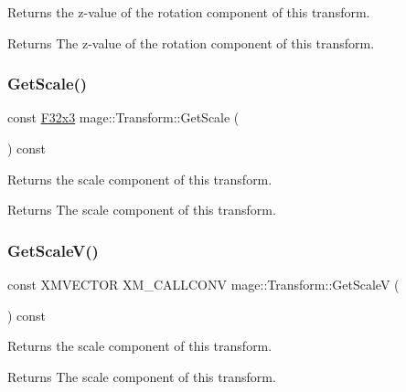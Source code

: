 Returns the z-\/value of the rotation component of this transform.

\begin{DoxyReturn}{Returns}
The z-\/value of the rotation component of this transform. 
\end{DoxyReturn}
\hypertarget{classmage_1_1_transform_a6d166fd4201a61c24b8d96cd5bba45f8}{}\label{classmage_1_1_transform_a6d166fd4201a61c24b8d96cd5bba45f8} 
\subsubsection{\texorpdfstring{Get\+Scale()}{GetScale()}}
{\footnotesize\ttfamily const \hyperlink{namespacemage_a73fbe0da4b8d5bc156bb8453e5b63a17}{F32x3} mage\+::\+Transform\+::\+Get\+Scale (\begin{DoxyParamCaption}{ }\end{DoxyParamCaption}) const\hspace{0.3cm}{\ttfamily [noexcept]}}

Returns the scale component of this transform.

\begin{DoxyReturn}{Returns}
The scale component of this transform. 
\end{DoxyReturn}
\hypertarget{classmage_1_1_transform_acb6e1da2673c6b359fc8b891f3f556ec}{}\label{classmage_1_1_transform_acb6e1da2673c6b359fc8b891f3f556ec} 
\subsubsection{\texorpdfstring{Get\+Scale\+V()}{GetScaleV()}}
{\footnotesize\ttfamily const X\+M\+V\+E\+C\+T\+OR X\+M\+\_\+\+C\+A\+L\+L\+C\+O\+NV mage\+::\+Transform\+::\+Get\+ScaleV (\begin{DoxyParamCaption}{ }\end{DoxyParamCaption}) const\hspace{0.3cm}{\ttfamily [noexcept]}}

Returns the scale component of this transform.

\begin{DoxyReturn}{Returns}
The scale component of this transform. 
\end{DoxyReturn}
\hypertarget{classmage_1_1_transform_a86eff370d6cb37a7aa5f7d78d4cf3cf4}{}\label{classmage_1_1_transform_a86eff370d6cb37a7aa5f7d78d4cf3cf4} 
